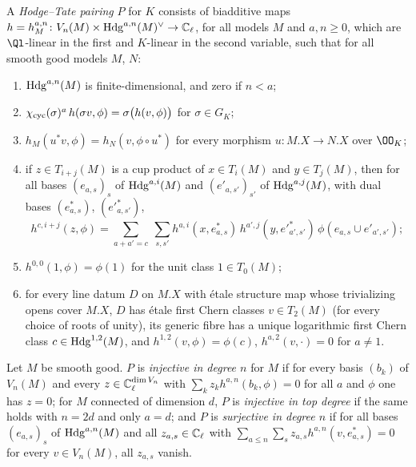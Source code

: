 \begin{definition}\label{pf:steps1:def:htpre}
A \emph{Hodge--Tate pairing} $P$ for $K$ consists of biadditive maps
$h=h_M^{a,n}\colon V_n(M)\times\mathrm{Hdg}^{a,n}(M)^\vee\to\mathbb{C}_\ell$, for all models $M$ and $a,n\ge0$, which are
$\Ql$-linear in the first and $K$-linear in the second variable, such that for all smooth good models $M$, $N$:
\begin{enumerate}[label=\textup{(\roman*)},nosep]
\item $\mathrm{Hdg}^{a,n}(M)$ is finite-dimensional, and zero if $n<a$;
\item $\chi_{\mathrm{cyc}}(\sigma)^a\,h(\sigma v,\phi)=\sigma\bigl(h(v,\phi)\bigr)$ for $\sigma\in G_K$;
\item $h_M(u^*v,\phi)=h_N(v,\phi\circ u^*)$ for every morphism $u\colon M.X\to N.X$ over $\OO_K$;
\item if $z\in T_{i+j}(M)$ is a cup product of $x\in T_i(M)$ and $y\in T_j(M)$, then for all bases $(e_{a,s})_s$ of
  $\mathrm{Hdg}^{a,i}(M)$ and $(e'_{a,s'})_{s'}$ of $\mathrm{Hdg}^{a,j}(M)$, with dual bases $(e^*_{a,s})$, $(e'^*_{a,s'})$,
  \begin{equation}\label{pf:steps1:eq:htcup}
   h^{c,i+j}(z,\phi)=\sum_{a+a'=c}\ \sum_{s,s'}h^{a,i}(x,e^*_{a,s})\,h^{a',j}(y,e'^*_{a',s'})\,\phi(e_{a,s}\cup e'_{a',s'});
  \end{equation}
\item $h^{0,0}(1,\phi)=\phi(1)$ for the unit class $1\in T_0(M)$;
\item for every line datum $D$ on $M.X$ with \'etale structure map whose trivializing opens cover $M.X$, $D$ has \'etale first
  Chern classes $v\in T_2(M)$ (for every choice of roots of unity), its generic fibre has a unique logarithmic first Chern
  class $c\in\mathrm{Hdg}^{1,2}(M)$, and $h^{1,2}(v,\phi)=\phi(c)$, $h^{a,2}(v,\cdot)=0$ for $a\ne1$.
\end{enumerate}
Let $M$ be smooth good. $P$ is \emph{injective in degree $n$} for $M$ if for every basis $(b_k)$ of $V_n(M)$ and every
$z\in\mathbb{C}_\ell^{\dim V_n}$ with $\sum_kz_kh^{a,n}(b_k,\phi)=0$ for all $a$ and $\phi$ one has $z=0$; for $M$ connected of
dimension $d$, $P$ is \emph{injective in top degree} if the same holds with $n=2d$ and only $a=d$; and $P$ is
\emph{surjective in degree $n$} if for all bases $(e_{a,s})_s$ of $\mathrm{Hdg}^{a,n}(M)$ and all $z_{a,s}\in\mathbb{C}_\ell$ with
$\sum_{a\le n}\sum_sz_{a,s}h^{a,n}(v,e^*_{a,s})=0$ for every $v\in V_n(M)$, all $z_{a,s}$ vanish.
 
 
\end{definition}

